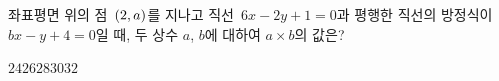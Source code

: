 좌표평면 위의 점~$(2{,}\mkern3mu a)$를 지나고 직선~$6x-2y+1=0$과 평행한 직선의 방정식이 $bx-y+4=0$일 때, 두 상수 $a$, $b$에 대하여 $a\times b$의 값은?
\begin{choices32}{$24$}{$26$}{$28$}{$30$}{$32$}\end{choices32}
